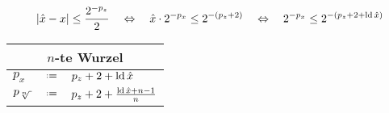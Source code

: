 \begin{equation*}
  |\hat{x}-x| \le \frac{2^{-p_z}}{2} 
  \quad\Leftrightarrow\quad
  \hat{x}\cdot 2^{-p_x} \le 2^{-(p_z+2)}
  \quad\Leftrightarrow\quad
  2^{-p_x} \le 2^{-(p_z+2+\mathop{\rm ld}\nolimits\hat{x})}
\end{equation*}

\begin{algorithm}
\phantom{}
\begin{center}
\renewcommand*{\arraystretch}{1.3}
\begin{tabular}{lcl}
  \hline
  \multicolumn{3}{c}{$n$-te Wurzel} \\
  \hline
   $p_x$   & $\defeq$ & $p_z+2+\mathop{\rm ld}\nolimits\hat{x}$ \\
   $p_\op$ & $\defeq$ & $p_z+2+\frac{\mathop{\rm ld}\nolimits\hat{x}+n-1}{n}$ \\
  \hline
\end{tabular}
\end{center}
\end{algorithm}

%
%
